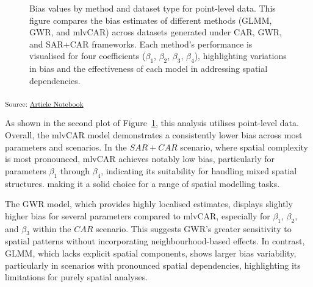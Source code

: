 \documentclass[
  default,
]{sn-jnl}
\begin{document}
\label{cell-fig-biaspointlevel}
\begin{figure}[H]


\caption{\label{fig-biaspointlevel}Bias values by method and dataset
type for point-level data. This figure compares the bias estimates of
different methods (GLMM, GWR, and mlvCAR) across datasets generated
under CAR, GWR, and SAR+CAR frameworks. Each method's performance is
visualised for four coefficients (\(\beta_1\), \(\beta_2\), \(\beta_3\),
\(\beta_4\)), highlighting variations in bias and the effectiveness of
each model in addressing spatial dependencies.}

\end{figure}%

\textsubscript{Source:
\href{https://indiraputeri-phd.github.io/CAR_simcomp/manuscript.qmd.html}{Article
Notebook}}

As shown in the second plot of Figure~\ref{fig-biaspointlevel}, this
analysis utilises point-level data. Overall, the mlvCAR model
demonstrates a consistently lower bias across most parameters and
scenarios. In the \(SAR + CAR\) scenario, where spatial complexity is
most pronounced, mlvCAR achieves notably low bias, particularly for
parameters \(\beta_1\) through \(\beta_4\), indicating its suitability
for handling mixed spatial structures. making it a solid choice for a
range of spatial modelling tasks.

The GWR model, which provides highly localised estimates, displays
slightly higher bias for several parameters compared to mlvCAR,
especially for \(\beta_1\), \(\beta_2\), and \(\beta_3\) within the
\(CAR\) scenario. This suggests GWR's greater sensitivity to spatial
patterns without incorporating neighbourhood-based effects. In contrast,
GLMM, which lacks explicit spatial components, shows larger bias
variability, particularly in scenarios with pronounced spatial
dependencies, highlighting its limitations for purely spatial analyses.
\end{document}
